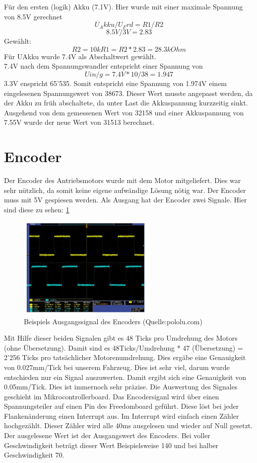 \documentclass[a4paper, 10pt, fleqn]{article}
\begin{document}
Für den ersten (logik) Akku (7.1V). Hier wurde mit einer maximale Spannung von 8.5V gerechnet
\[	U_Akku/U_Frd=R1/R2\]
\[	8.5V/3V=2.83\]
Gewählt:
\[	R2=10k R1=R2*2.83=28.3kOhm\]
Für UAkku wurde 7.4V als Abschaltwert gewählt.\\
7.4V nach dem Spannungswandler entspricht einer Spannung von \[Uin/g=7.4V*10/38=1.947\]
3.3V enspricht 65'535. Somit entspricht eine Spannung von 1.974V einem eingelesenen Spannungswert von 38673. Dieser Wert musste angepasst werden, da der Akku zu früh abschaltete, da unter Last die Akkuspannung kurzzeitig sinkt. Ausgehend von dem gemessenen Wert von 32158 und einer Akkuspannung von 7.55V wurde der neue Wert von 31513 berechnet.

\section{Encoder}
Der Encoder des Antriebsmotors wurde mit dem Motor mitgeliefert. Dies war sehr nützlich, da somit keine eigene aufwändige Lösung nötig war. Der Encoder muss mit 5V gespiesen werden. Als Ausgang hat der Encoder zwei Signale. Hier sind diese zu sehen:
\ref{fig:encoder_out}
\begin{figure}[H]%
\centering
\includegraphics[width=0.6\textwidth]{Images/Encoder_Out.PNG}
\caption{Beispiels Ausgangssignal des Encoders (Quelle:pololu.com)}
\label{fig:encoder_out}
\end{figure}
Mit Hilfe dieser beiden Signalen gibt es 48 Ticks pro Umdrehung des Motors (ohne Übersetzung). Damit sind es 48Ticks/Umdrehung * 47 (Übersetzung) = 2'256 Ticks pro tatsächlicher Motorenumdrehung. Dies ergäbe eine Genauigkeit von 0.027mm/Tick bei unserem Fahrzeug. Dies ist sehr viel, darum wurde entschieden nur ein Signal auszuwerten. Damit ergibt sich eine Genauigkeit von 0.05mm/Tick. Dies ist immernoch sehr präzise.
Die Auswertung des Signales geschieht im Mikrocontrollerboard. Das Encodersiganl wird über einen Spannungsteiler auf einen Pin des Freedomboard geführt. Diese löst bei jeder Flankenänderung einen Interrupt aus. Im Interrupt wird einfach einen Zähler hochgezählt. Dieser Zähler wird alle 40ms ausgelesen und wieder auf Null gesetzt. Der ausgelesene Wert ist der Ausgangswert des Encoders. Bei voller Geschwindigkeit beträgt dieser Wert Beispielsweise 140 und bei halber Geschwindigkeit 70.
 
\end{document}
